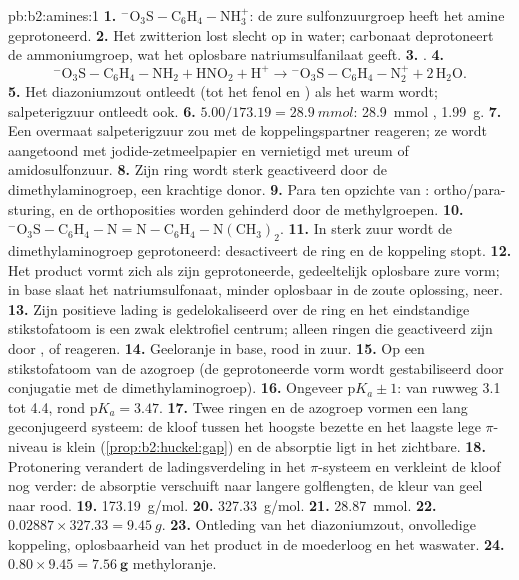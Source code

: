 \begin{solution}{pb:b2:amines:1}
\textbf{1.} $\mathrm{{}^-O_3S{-}C_6H_4{-}NH_3^+}$: de zure sulfonzuurgroep heeft het amine geprotoneerd.
\textbf{2.} Het zwitterion lost slecht op in water; carbonaat deprotoneert de ammoniumgroep,
wat het oplosbare natriumsulfanilaat geeft.
\textbf{3.} .
\textbf{4.}
\[
  \mathrm{{}^-O_3S{-}C_6H_4{-}NH_2 + HNO_2 + H^+ \to {}^-O_3S{-}C_6H_4{-}N_2^+ + 2\,H_2O} .
\]
\textbf{5.} Het diazoniumzout ontleedt (tot het fenol en ) als het warm wordt; salpeterigzuur
ontleedt ook.
\textbf{6.} $5.00/173.19 = \qty{28.9}{mmol}$: \qty{28.9}{mmol} , \qty{1.99}{g}.
\textbf{7.} Een overmaat salpeterigzuur zou met de koppelingspartner reageren; ze wordt aangetoond met jodide-zetmeelpapier
en vernietigd met ureum of amidosulfonzuur.
\textbf{8.} Zijn ring wordt sterk geactiveerd door de dimethylaminogroep, een krachtige donor.
\textbf{9.} Para ten opzichte van : ortho/para-sturing, en de orthoposities worden gehinderd door de
methylgroepen.
\textbf{10.} $\mathrm{{}^-O_3S{-}C_6H_4{-}N{=}N{-}C_6H_4{-}N(CH_3)_2}$.
\textbf{11.} In sterk zuur wordt de dimethylaminogroep geprotoneerd:  desactiveert de ring
en de koppeling stopt.
\textbf{12.} Het product vormt zich als zijn geprotoneerde, gedeeltelijk oplosbare zure vorm; in base slaat het natriumsulfonaat,
minder oplosbaar in de zoute oplossing, neer.
\textbf{13.} Zijn positieve lading is gedelokaliseerd over de ring en het eindstandige stikstofatoom is een zwak
elektrofiel centrum; alleen ringen die geactiveerd zijn door ,  of  reageren.
\textbf{14.} Geeloranje in base, rood in zuur.
\textbf{15.} Op een stikstofatoom van de azogroep (de geprotoneerde vorm wordt gestabiliseerd door conjugatie met
de dimethylaminogroep).
\textbf{16.} Ongeveer $\mathrm pK_a \pm 1$: van ruwweg 3.1 tot 4.4, rond $\mathrm pK_a = 3.47$.
\textbf{17.} Twee ringen en de azogroep vormen een lang geconjugeerd systeem: de kloof tussen het hoogste
bezette en het laagste lege $\pi$-niveau is klein (\cref{prop:b2:huckel:gap}) en de absorptie
ligt in het zichtbare.
\textbf{18.} Protonering verandert de ladingsverdeling in het $\pi$-systeem en verkleint de kloof
nog verder: de absorptie verschuift naar langere golflengten, de kleur van geel naar rood.
\textbf{19.} \qty{173.19}{g/mol}.
\textbf{20.} \qty{327.33}{g/mol}.
\textbf{21.} \qty{28.87}{mmol}.
\textbf{22.} $0.02887 \times 327.33 = \qty{9.45}{g}$.
\textbf{23.} Ontleding van het diazoniumzout, onvolledige koppeling, oplosbaarheid van het product in
de moederloog en het waswater.
\textbf{24.} $0.80 \times 9.45 = \boldsymbol{\qty{7.56}{g}}$ methyloranje.
\end{solution}
